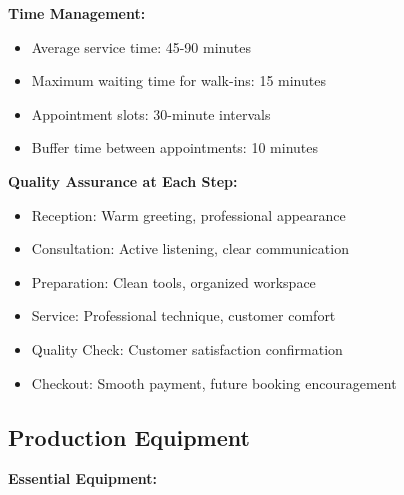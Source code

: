 \vspace{1em}

\begin{tcolorbox}[mybox, title=\textbf{Process Efficiency Measures}]
\textbf{Time Management:}
\begin{itemize}[leftmargin=1em, itemsep=0pt]
    \item Average service time: 45-90 minutes
    \item Maximum waiting time for walk-ins: 15 minutes
    \item Appointment slots: 30-minute intervals
    \item Buffer time between appointments: 10 minutes
\end{itemize}

\textbf{Quality Assurance at Each Step:}
\begin{itemize}[leftmargin=1em, itemsep=0pt]
    \item Reception: Warm greeting, professional appearance
    \item Consultation: Active listening, clear communication
    \item Preparation: Clean tools, organized workspace
    \item Service: Professional technique, customer comfort
    \item Quality Check: Customer satisfaction confirmation
    \item Checkout: Smooth payment, future booking encouragement
\end{itemize}
\end{tcolorbox}

\subsection{Production Equipment}

\textbf{Essential Equipment:}

